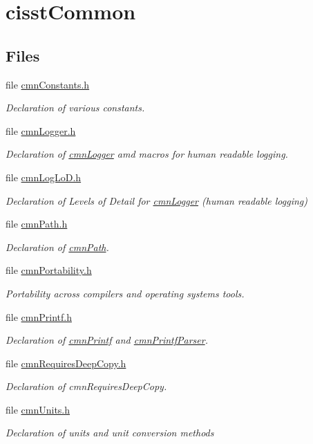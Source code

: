 \hypertarget{group__cisst_common}{\section{cisst\-Common}
\label{group__cisst_common}
}
\subsection*{Files}
\begin{DoxyCompactItemize}
\item 
file \hyperlink{cmn_constants_8h}{cmn\-Constants.\-h}
\begin{DoxyCompactList}\small\item\em Declaration of various constants. \end{DoxyCompactList}\item 
file \hyperlink{cmn_logger_8h}{cmn\-Logger.\-h}
\begin{DoxyCompactList}\small\item\em Declaration of \hyperlink{classcmn_logger}{cmn\-Logger} amd macros for human readable logging. \end{DoxyCompactList}\item 
file \hyperlink{cmn_log_lo_d_8h}{cmn\-Log\-Lo\-D.\-h}
\begin{DoxyCompactList}\small\item\em Declaration of Levels of Detail for \hyperlink{classcmn_logger}{cmn\-Logger} (human readable logging) \end{DoxyCompactList}\item 
file \hyperlink{cmn_path_8h}{cmn\-Path.\-h}
\begin{DoxyCompactList}\small\item\em Declaration of \hyperlink{classcmn_path}{cmn\-Path}. \end{DoxyCompactList}\item 
file \hyperlink{cmn_portability_8h}{cmn\-Portability.\-h}
\begin{DoxyCompactList}\small\item\em Portability across compilers and operating systems tools. \end{DoxyCompactList}\item 
file \hyperlink{cmn_printf_8h}{cmn\-Printf.\-h}
\begin{DoxyCompactList}\small\item\em Declaration of \hyperlink{classcmn_printf}{cmn\-Printf} and \hyperlink{classcmn_printf_parser}{cmn\-Printf\-Parser}. \end{DoxyCompactList}\item 
file \hyperlink{cmn_requires_deep_copy_8h}{cmn\-Requires\-Deep\-Copy.\-h}
\begin{DoxyCompactList}\small\item\em Declaration of cmn\-Requires\-Deep\-Copy. \end{DoxyCompactList}\item 
file \hyperlink{cmn_units_8h}{cmn\-Units.\-h}
\begin{DoxyCompactList}\small\item\em Declaration of units and unit conversion methods


\end{DoxyCompactList}
\end{DoxyCompactItemize}
